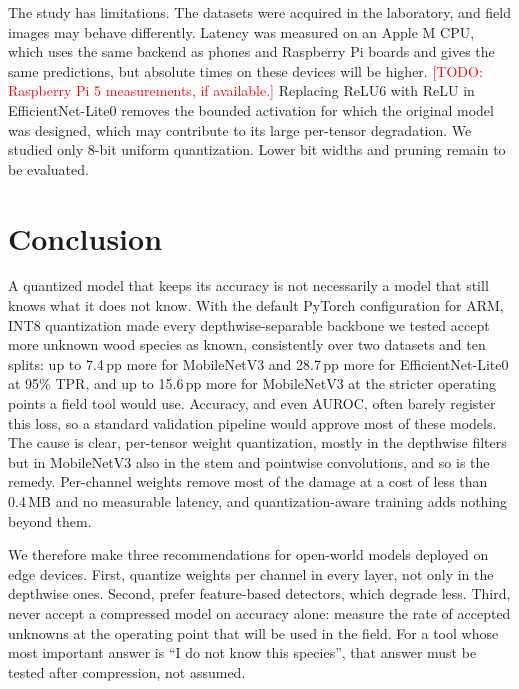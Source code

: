 \documentclass[conference]{IEEEtran}
\newcommand{\todo}[1]{\textcolor{red}{[TODO: #1]}}
\begin{document}
The study has limitations. The datasets were acquired in the laboratory, and field images may behave differently. Latency was measured on an Apple M CPU, which uses the same backend as phones and Raspberry Pi boards and gives the same predictions, but absolute times on these devices will be higher. \todo{Raspberry Pi 5 measurements, if available.} Replacing ReLU6 with ReLU in EfficientNet-Lite0 removes the bounded activation for which the original model was designed, which may contribute to its large per-tensor degradation. We studied only 8-bit uniform quantization. Lower bit widths and pruning remain to be evaluated.

\section{Conclusion}

A quantized model that keeps its accuracy is not necessarily a model that still knows what it does not know. With the default PyTorch configuration for ARM, INT8 quantization made every depthwise-separable backbone we tested accept more unknown wood species as known, consistently over two datasets and ten splits: up to 7.4\,pp more for MobileNetV3 and 28.7\,pp more for EfficientNet-Lite0 at 95\% TPR, and up to 15.6\,pp more for MobileNetV3 at the stricter operating points a field tool would use. Accuracy, and even AUROC, often barely register this loss, so a standard validation pipeline would approve most of these models. The cause is clear, per-tensor weight quantization, mostly in the depthwise filters but in MobileNetV3 also in the stem and pointwise convolutions, and so is the remedy. Per-channel weights remove most of the damage at a cost of less than 0.4\,MB and no measurable latency, and quantization-aware training adds nothing beyond them.

We therefore make three recommendations for open-world models deployed on edge devices. First, quantize weights per channel in every layer, not only in the depthwise ones. Second, prefer feature-based detectors, which degrade less. Third, never accept a compressed model on accuracy alone: measure the rate of accepted unknowns at the operating point that will be used in the field. For a tool whose most important answer is ``I do not know this species'', that answer must be tested after compression, not assumed.



\end{document}
